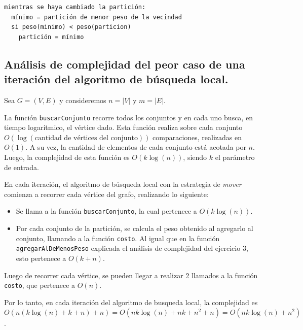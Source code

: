 \begin{verbatim}
mientras se haya cambiado la partición:
  mínimo = partición de menor peso de la vecindad
  si peso(minimo) < peso(particion)
    partición = mínimo
\end{verbatim}



\newpage
\subsection{Análisis de complejidad del peor caso de una iteración del
            algoritmo de búsqueda local.}
\vspace*{0.3cm}

Sea $G = (V,E)$ y consideremos $n = |V|$ y $m = |E|$.

La función \texttt{buscarConjunto} recorre todos los conjuntos y en cada uno
busca, en tiempo logarítmico, el vértice dado. Esta función realiza sobre cada
conjunto $O(\log(\text{cantidad de vértices del conjunto}))$ comparaciones,
realizadas en $O(1)$. A su vez, la cantidad de elementos de cada conjunto está
acotada por $n$. Luego, la complejidad de esta función es $O(k\log(n))$, siendo
$k$ el parámetro de entrada.

\vspace*{0.3cm}

En cada iteración, el algoritmo de búsqueda local con la estrategia de
\textit{mover} comienza a recorrer cada vértice del grafo, realizando lo siguiente:
\begin{itemize}
  \item Se llama a la función \texttt{buscarConjunto}, la cual pertenece a
  $O(k\log(n))$.

  \item Por cada conjunto de la partición, se calcula el peso obtenido al
  agregarlo al conjunto, llamando a la función \texttt{costo}. Al igual que en
  la función \texttt{agregarAlDeMenosPeso} explicada el análisis de complejidad del ejercicio 3, esto pertenece a $O(k + n)$.
\end{itemize}

Luego de recorrer cada vértice, se pueden llegar a realizar 2 llamados a
la función \texttt{costo}, que pertenece a $O(n)$.

Por lo tanto, en cada iteración del algoritmo de busqueda local, la complejidad
es $O(n (k\log(n) + k + n) + n) = O(nk\log(n) + nk + n^2 + n) = O(nk\log(n) +
n^2)$.

\vspace*{0.3cm}

